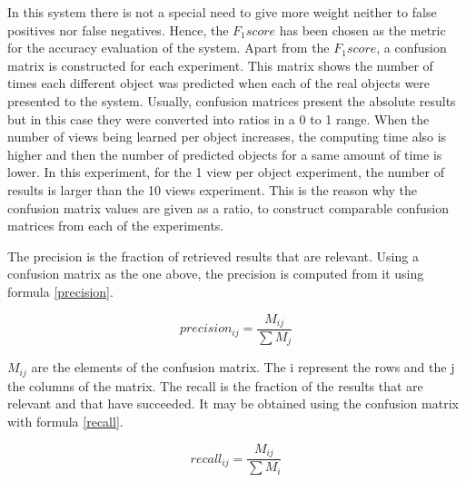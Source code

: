 		In this system there is not a special need to give more weight neither to false positives nor false negatives. 
		Hence, the $F_1 score$ has been chosen as the metric for the accuracy evaluation of the system.		
		Apart from the $F_1 score$, a confusion matrix is constructed for each experiment. 
		This matrix shows the number of times each different object was predicted when each of the real objects were presented to the system. 
		Usually, confusion matrices present the absolute results but in this case they were converted into ratios in a 0 to 1 range. 
		When the number of views being learned per object increases, the computing time also is higher and then the number of predicted objects for a same amount of time is lower. 
		In this experiment, for the 1 view per object experiment, the number of results is larger than the 10 views experiment. 
		This is the reason why the confusion matrix values are given as a ratio, to construct comparable confusion matrices from each of the experiments. 






		The precision is the fraction of retrieved results that are relevant.  
		Using a confusion matrix as the one above, the precision is computed from it using formula \ref{precision}.
		\begin{center}
		\begin{equation}
		\label{precision}
		precision_{ij}=\frac{M_{ij}}{\sum M_j}
		\end{equation}
		\end{center}

		$M_{ij}$ are the elements of the confusion matrix. 
		The i represent the rows and the j the columns of the matrix. 
		The recall is the fraction of the results that are relevant and that have succeeded. 
		It may be obtained using the confusion matrix with formula \ref{recall}.
		\begin{center}
		\begin{equation}
		\label{recall}
		recall_{ij}=\frac{M_{ij}}{\sum M_i}
		\end{equation}
		\end{center}

